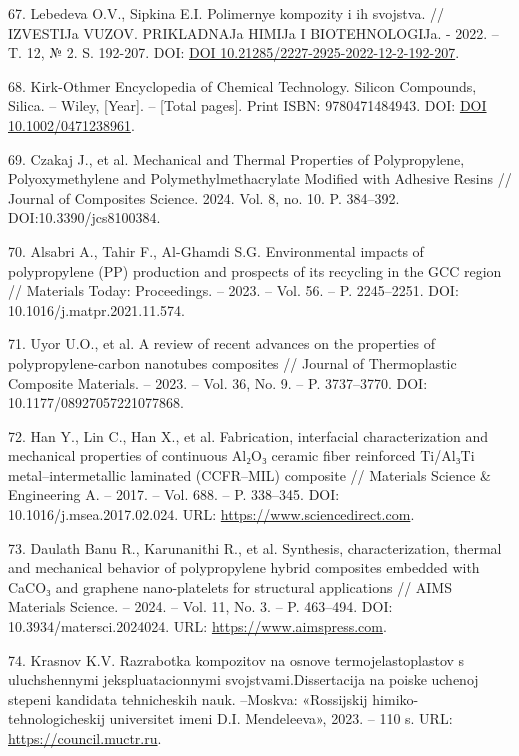 \begin{references}
67. Lebedeva O.V., Sipkina E.I. Polimernye kompozity i ih svojstva. //
IZVESTIJa VUZOV. PRIKLAD\-NAJa HIMIJa I BIOTEHNOLOGIJa. - 2022. – T. 12,
№
2. S. 192-207. DOI: \href{https://doi.org/10.21285/2227-2925-2022-12-2-192-207}{DOI 10.21285/2227-2925-2022-12-2-192-207}.

68. Kirk-Othmer Encyclopedia of Chemical Technology. Silicon
Compounds, Silica. – Wiley, [Year]. – [Total pages]. Print ISBN:
9780471484943. DOI: \href{https://doi.org/10.1002/0471238961}{DOI 10.1002/0471238961}.

69. Czakaj J., et al. Mechanical and Thermal Properties of
Polypropylene, Polyoxymethylene and Polymeth\-ylmethacrylate Modified
with Adhesive Resins // Journal of Composites Science. 2024. Vol. 8,
no. 10. P. 384–392. DOI:10.3390/jcs8100384.

70. Alsabri A., Tahir F., Al-Ghamdi S.G. Environmental impacts of
polypropylene (PP) production and prospects of its recycling in the
GCC region // Materials Today: Proceedings. – 2023. – Vol. 56. –
P. 2245–2251. DOI: 10.1016/j.matpr.2021.11.574.

71. Uyor U.O., et al. A review of recent advances on the properties of
polypropylene-carbon nanotubes composites // Journal of Thermoplastic
Composite Materials. – 2023. – Vol. 36, No. 9. – P. 3737–3770. DOI:
10.1177/08927057221077868.

72. Han Y., Lin C., Han X., et al. Fabrication, interfacial
characterization and mechanical properties of continuous Al₂O₃ ceramic
fiber reinforced Ti/Al₃Ti metal–intermetallic laminated (CCFR–MIL)
composite // Materials Science \& Engineering A. – 2017. – Vol. 688. –
P. 338–345. DOI: 10.1016/j.msea.2017.02.024.
URL: \href{https://www.sciencedirect.com/science/article/abs/pii/S0921509317302024}{https://www.sciencedirect.com}.

73. Daulath Banu R., Karunanithi R., et al. Synthesis,
characterization, thermal and mechanical behavior of polypropylene
hybrid composites embedded with CaCO₃ and graphene nano-platelets for
structural applications // AIMS Materials Science. – 2024. – Vol. 11,
No. 3. – P. 463–494. DOI: \\10.3934/matersci.2024024.
URL: \href{https://www.aimspress.com/article/id/662b8640ba35de0a25643462}{https://www.aimspress.com}.

74. Krasnov K.V. Razrabotka kompozitov na osnove termojelastoplastov s
uluchshennymi jekspluatacion\-nymi svojstvami.Dissertacija na poiske
uchenoj stepeni kandidata tehnicheskih nauk. –Moskva: «Rossijskij
himiko-tehnologicheskij universitet imeni D.I. Mendeleeva», 2023. –
110
s. URL: \href{https://council.muctr.ru/media/CandidateCase/a9f669f0-fca4-432b-b67a-486bc3249d8c/c1127708-3fd5-4193-914b-954ad3d04239.pdf?utm_source}{https://council.muctr.ru}.


\end{references}
